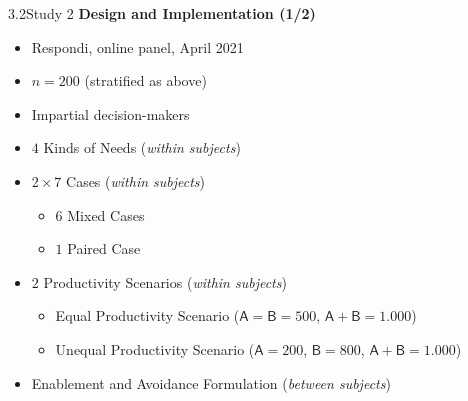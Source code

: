 \documentclass[xcolor=table,9pt,aspectratio=169]{beamer}
\begin{document}
\begin{frame}{\vspace*{10mm}3.2\hspace*{1em}Study 2}
\textbf{Design and Implementation (1/2)}\\
\medskip
\begin{itemize}
   \item Respondi, online panel, April 2021
   \item $n=200$ (stratified as above)
   \item Impartial decision-makers
   \item $4$ Kinds of Needs (\textit{within subjects})
   \item $2\times7$ Cases (\textit{within subjects})
   \begin{itemize}
      \item $6$ Mixed Cases
      \item $1$ Paired Case
   \end{itemize}
   \item $2$ Productivity Scenarios (\textit{within subjects})
   \begin{itemize}
      \item Equal Productivity Scenario ($\textsf{A}=\textsf{B}=500$, $\textsf{A}+\textsf{B}=1.000$)
      \item Unequal Productivity Scenario ($\textsf{A}=200$, $\textsf{B}=800$, $\textsf{A}+\textsf{B}=1.000$)
   \end{itemize}
   \item Enablement and Avoidance Formulation (\textit{between subjects})
\end{itemize}
\end{frame}
\end{document}
